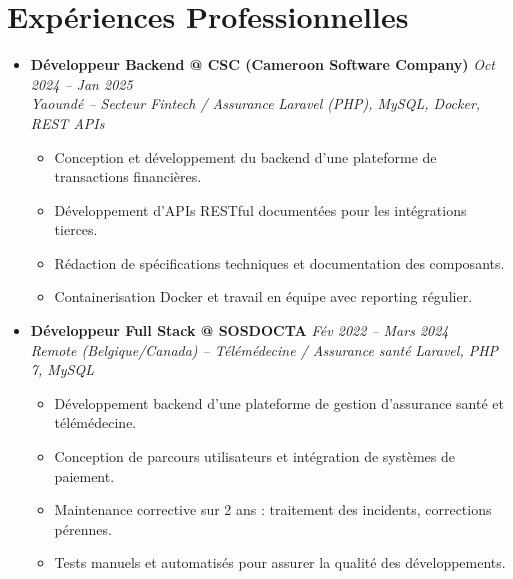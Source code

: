 \documentclass[a4paper,11pt]{article}
\begin{document}
\section{Expériences Professionnelles}
\begin{itemize}[leftmargin=*, label={-}]

\item \textbf{Développeur Backend @ CSC (Cameroon Software Company)} \hfill \textit{Oct 2024 -- Jan 2025} \\
\textit{Yaoundé -- Secteur Fintech / Assurance} \hfill \textit{Laravel (PHP), MySQL, Docker, REST APIs}
\vspace{-2pt}
    \begin{itemize}[leftmargin=0.4cm, nosep, label=\tiny$\bullet$]
        \item \small{Conception et développement du backend d'une plateforme de transactions financières.}
        \item \small{Développement d'APIs RESTful documentées pour les intégrations tierces.}
        \item \small{Rédaction de spécifications techniques et documentation des composants.}
        \item \small{Containerisation Docker et travail en équipe avec reporting régulier.}
    \end{itemize}
\vspace{3pt}

\item \textbf{Développeur Full Stack @ SOSDOCTA} \hfill \textit{Fév 2022 -- Mars 2024} \\
\textit{Remote (Belgique/Canada) -- Télémédecine / Assurance santé} \hfill \textit{Laravel, PHP 7, MySQL}
\vspace{-2pt}
    \begin{itemize}[leftmargin=0.4cm, nosep, label=\tiny$\bullet$]
        \item \small{Développement backend d'une plateforme de gestion d'assurance santé et télémédecine.}
        \item \small{Conception de parcours utilisateurs et intégration de systèmes de paiement.}
        \item \small{Maintenance corrective sur 2 ans : traitement des incidents, corrections pérennes.}
        \item \small{Tests manuels et automatisés pour assurer la qualité des développements.}
    \end{itemize}
\vspace{3pt}


\end{itemize}
\end{document}
